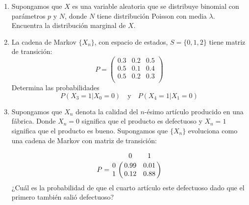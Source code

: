 \documentclass{report}
\begin{document}
\begin{enumerate}
\item Supongamos que $X$ es una variable aleatoria que se distribuye binomial con parámetros $p$ y $N$, donde $N$ tiene distribución Poisson con media $\lambda$. Encuentra la distribución marginal de $X$. 
\item La cadena de Markov $\{X_n\}$, con espacio de estados, $S =\{0,1,2\}$ tiene matriz de transición:
$$
P = \left(\begin{matrix}
	0 .3 & 0.2 & 0.5 \\
	0.5  & 0.1 & 0.4 \\
	0 .5 & 0.2  & 0.3 \\
\end{matrix}\right)
$$
Determina las probabilidades 
$$
P(X_3=1\vert X_0=0)\quad \mbox{y}\quad P(X_4=1\vert X_1=0)
$$
%
\item Supongamos que $X_n$ denota la calidad del $n$-ésimo artículo producido en una fábrica. Donde $X_n=0$ significa que el producto es defectuoso y $X_n=1$ significa que el producto es bueno. Supongamos que $\{X_n\}$ evoluciona como una cadena de Markov con matriz de transición:
    
$$
P = \bordermatrix{~ & 0   & 1   \cr
                  0 & 0.99 & 0.01 \cr
                  1 & 0.12 & 0.88 \cr
                  }
$$
¿Cuál es la probabilidad de que el cuarto artículo este defectuoso dado que el primero también salió defectuoso?


\end{enumerate}
\end{document}

